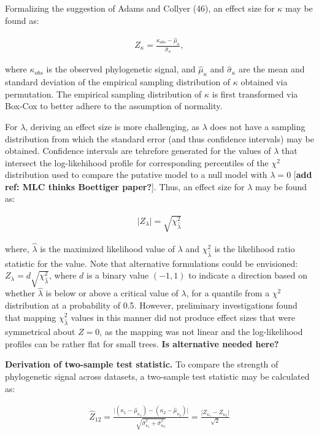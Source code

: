 \documentclass[9pt,twocolumn,twoside,lineno]{pnas-new}
\begin{document}
Formalizing the suggestion of Adams and Collyer (46), an effect size for
\(\kappa\) may be found as:

\begin{align}
    Z_\kappa=\frac{\kappa_{obs}-\hat\mu_{\kappa}}{\hat\sigma_{\kappa}},
\end{align}

where \(\kappa_{obs}\) is the observed phylogenetic signal, and
\(\hat\mu_\kappa\) and \(\hat\sigma_\kappa\) are the mean and standard
deviation of the empirical sampling distribution of \(\kappa\) obtained
via permutation. The empirical sampling distribution of \(\kappa\) is
first transformed via Box-Cox to better adhere to the assumption of
normality.

For \(\lambda\), deriving an effect size is more challenging, as
\(\lambda\) does not have a sampling distribution from which the
standard error (and thus confidence intervals) may be obtained.
Confidence intervals are tehrefore generated for the values of
\(\lambda\) that intersect the log-likehihood profile for corresponding
percentiles of the \(\chi^2\) distribution used to compare the putative
model to a null model with \(\lambda = 0\) {[}\textbf{add ref: MLC
thinks Boettiger paper?}{]}. Thus, an effect size for \(\lambda\) may be
found as:

\begin{align}
   \lvert Z_{\lambda} \rvert = \sqrt{\chi^2_{\hat{\lambda}}}
\end{align}

where, \(\hat{\lambda}\) is the maximized likelihood value of
\(\lambda\) and \(\chi^{2}_{\hat{\lambda}}\) is the likelihood ratio
statistic for the value. Note that alternative formulations could be
envisioned: \(Z_{\lambda} = d \sqrt{\chi^2_{\hat{\lambda}}}\), where
\(d\) is a binary value \((-1,1)\) to indicate a direction based on
whether \(\hat{\lambda}\) is below or above a critical value of
\(\lambda\), for a quantile from a \(\chi^{2}\) distribution at a
probability of 0.5. However, preliminary investigations found that
mapping \(\chi^2_{\hat{\lambda}}\) values in this manner did not produce
effect sizes that were symmetrical about \(Z = 0\), as the mapping was
not linear and the log-likelihood profiles can be rather flat for small
trees. \textbf{Is alternative needed here?}

\textbf{Derivation of two-sample test statistic.} To compare the
strength of phylogenetic signal across datasets, a two-sample test
statistic may be calculated as:

\begin{align}
  \hat{Z}_{12}=\frac{\lvert{(\kappa_{1}-\hat\mu_{\kappa_1})-(\kappa_{2}-\hat\mu_{\kappa_2})}\rvert}{\sqrt{\hat\sigma^2_{\kappa_1}+\hat\sigma^2_{\kappa_2}}} = \frac{\lvert Z_{\kappa_1} - Z_{\kappa_2}\rvert}{\sqrt{2}}
\end{align}
\end{document}
